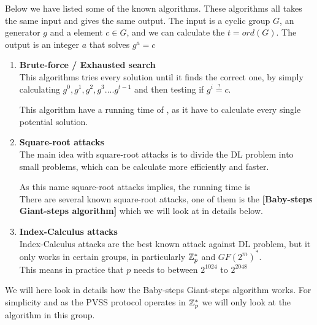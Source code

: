 \noindent
Below we have listed some of the known algorithms. These algorithms all takes the same input and gives the same output. The input is a cyclic group $G$, an generator $g$ and a element $c \in G$, and we can calculate the $t = ord(G)$. The output is an integer $a$ that solves $g^a = c$

\begin{enumerate}
    \item \textbf{Brute-force / Exhausted search} \\
    This algorithms tries every solution until it finds the correct one, by simply calculating
    $g^0, g^1, g^2, g^3....g^{t-1}$ and then testing if $g^i \stackrel{?}{=} c$.   
    
    \noindent
    This algorithm have a running time of , as it have to calculate
    every single potential solution. 
    
    \item \textbf{Square-root attacks} \\
    The main idea with square-root attacks is to divide the DL problem into small problems, which can be calculate more efficiently and faster. 
    
    \noindent
    As this name square-root attacks implies, the running time is  \\

    \noindent
    There are several known square-root attacks, one of them is the \textbf{[Baby-steps Giant-steps algorithm]} which we will look at in details below. \\          
    
    \item \textbf{Index-Calculus attacks} \\
    Index-Calculus attacks are the best known attack against DL problem, but it only
    works in certain groups, in particularly $\mathbb{Z}_p^* $ and $ GF(2^m)^* $. \\
    
    This means in practice that $p$ needs to between $ 2^{1024} $ to $ 2^{2048}$
\end{enumerate}


We will here look in details how the Baby-steps Giant-steps algorithm works. For simplicity and as the PVSS protocol
operates in $\mathbb{Z}_p^*$ we will only look at the algorithm in this group. \\

